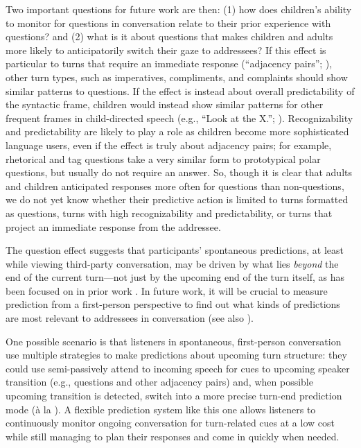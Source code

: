 \documentclass[authoryear, 12pt]{elsarticle}
\begin{document}
Two important questions for future work are then: (1) how does children's ability to monitor for questions in conversation relate to their prior experience with questions? and (2) what is it about questions that makes children and adults more likely to anticipatorily switch their gaze to addressees? If this effect is particular to turns that require an immediate response (``adjacency pairs''; \citealp{schegloff2007}), other turn types, such as imperatives, compliments, and complaints should show similar patterns to questions. If the effect is instead about overall predictability of the syntactic frame, children would instead show similar patterns for other frequent frames in child-directed speech (e.g., ``Look at the X.''; \citealp{mintz2003}). Recognizability and predictability are likely to play a role as children become more sophisticated language users, even if the effect is truly about adjacency pairs; for example, rhetorical and tag questions take a very similar form to prototypical polar questions, but usually do not require an answer. So, though it is clear that adults and children anticipated responses more often for questions than non-questions, we do not yet know whether their predictive action is limited to turns formatted as questions, turns with high recognizability and predictability, or turns that project an immediate response from the addressee.

The question effect suggests that participants' spontaneous predictions, at least while viewing third-party conversation, may be driven by what lies \textit{beyond} the end of the current turn---not just by the upcoming end of the turn itself, as has been focused on in prior work \citep{torreira2015, keitel2013, magyari2012, de-ruiter2006}. In future work, it will be crucial to measure prediction from a first-person perspective to find out what kinds of predictions are most relevant to addressees in conversation (see also \citealp{holler2015}).

One possible scenario is that listeners in spontaneous, first-person conversation use multiple strategies to make predictions about upcoming turn structure: they could use semi-passively attend to incoming speech for cues to upcoming speaker transition (e.g., questions and other adjacency pairs) and, when possible upcoming transition is detected, switch into a more precise turn-end prediction mode (\`{a} la \citealp{de-ruiter2006}). A flexible prediction system like this one allows listeners to continuously monitor ongoing conversation for turn-related cues at a low cost while still managing to plan their responses and come in quickly when needed.
\end{document}
